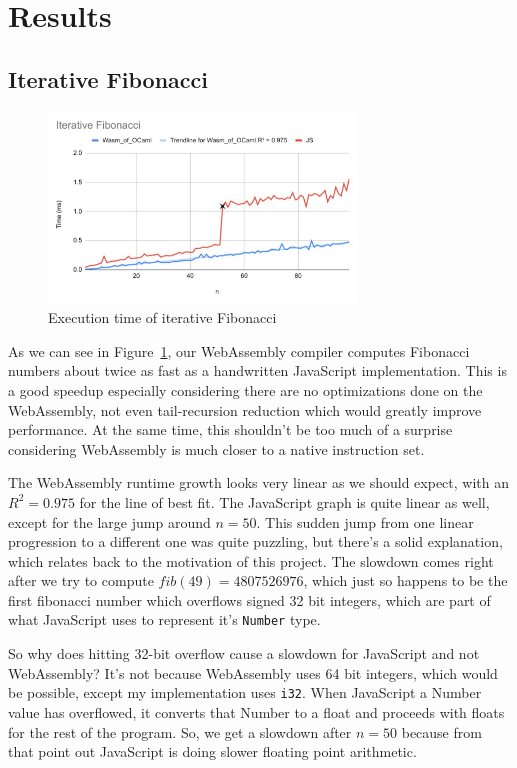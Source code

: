 \documentclass[12pt,a4paper,twoside,openright]{report}
\begin{document}
\section{Results}
\subsection{Iterative Fibonacci}
\begin{figure}[tbh]
\centerline{\includegraphics[height=2in]{fib-iter-graph}}
\caption{Execution time of iterative Fibonacci}
\label{fib-iter-graph}
\end{figure}
As we can see in Figure~\ref{fib-iter-graph}, our WebAssembly compiler computes Fibonacci numbers about twice as fast as a handwritten JavaScript implementation.
This is a good speedup especially considering there are no optimizations done on the WebAssembly, not even tail-recursion reduction which would greatly improve performance.
At the same time, this shouldn't be too much of a surprise considering WebAssembly is much closer to a native instruction set.

The WebAssembly runtime growth looks very linear as we should expect, with an $R^2 = 0.975$ for the line of best fit.
The JavaScript graph is quite linear as well, except for the large jump around $n=50$.
This sudden jump from one linear progression to a different one was quite puzzling, but there's a solid explanation, which relates back to the motivation of this project.
The slowdown comes right after we try to compute $fib(49) = 4807526976$, which just so happens to be the first fibonacci number which overflows signed 32 bit integers, which are part of what JavaScript uses to represent it's {\tt Number} type.

So why does hitting 32-bit overflow cause a slowdown for JavaScript and not WebAssembly?
It's not because WebAssembly uses 64 bit integers, which would be possible, except my implementation uses {\tt i32}.
When JavaScript a Number value has overflowed, it converts that Number to a float and proceeds with floats for the rest of the program.
So, we get a slowdown after $n=50$ because from that point out JavaScript is doing slower floating point arithmetic.
\end{document}
